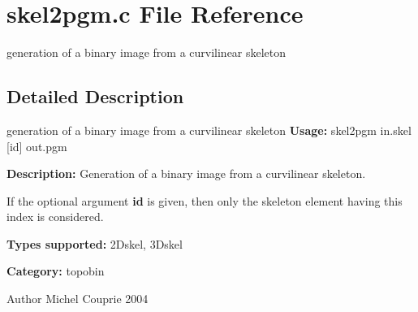 \section{skel2pgm.c File Reference}
\label{skel2pgm_8c}


generation of a binary image from a curvilinear skeleton  




\subsection{Detailed Description}
generation of a binary image from a curvilinear skeleton {\bfseries Usage:} skel2pgm in.skel [id] out.pgm

{\bfseries Description:} Generation of a binary image from a curvilinear skeleton.

If the optional argument {\bfseries id} is given, then only the skeleton element having this index is considered.

{\bfseries Types supported:} 2Dskel, 3Dskel

{\bfseries Category:} topobin

\begin{DoxyAuthor}{Author}
Michel Couprie 2004 
\end{DoxyAuthor}
